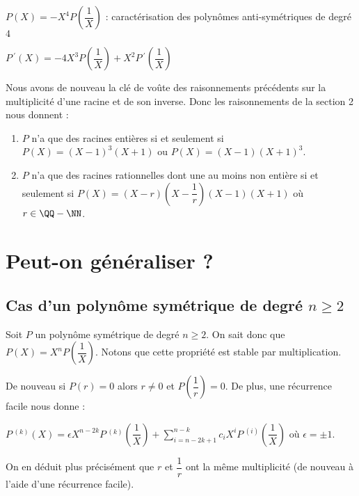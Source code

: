 \documentclass[12pt]{amsart}
\begin{document}
\medskip

$P(X) = -X^4 P\left( \dfrac1X \right)$ : caractérisation des polynômes anti-symétriques de degré $4$

\medskip

$P\,^{\prime}(X) = - 4 X^3 P\left( \dfrac1X \right) 
            + X^2 P\,^{\prime}\left( \dfrac1X \right)$


\medskip

Nous avons de nouveau la clé de voûte des raisonnements précédents sur la multiplicité d'une racine et de son inverse.
Donc les raisonnements de la section 2 nous donnent :

\begin{enumerate}
	\item $P$ n'a que des racines entières si et seulement si $P(X) = (X - 1)^3 (X + 1)$ ou $P(X) = (X - 1) (X + 1)^3$.

	\item $P$ n'a que des racines rationnelles dont une au moins non entière si et seulement si $P(X) = (X - r) \left( X - \dfrac1r \right) (X - 1) (X + 1)$ où $r \in \QQ - \NN$.
\end{enumerate}



\section{Peut-on généraliser ?}

\subsection*{Cas d'un polynôme symétrique de degré $n \geqslant 2$}

Soit $P$ un polynôme symétrique de degré $n \geqslant 2$. On sait donc que $P(X) = X^n P\left( \dfrac1X \right)$. Notons que cette propriété est stable par multiplication. 

\medskip

De nouveau si $P(r) = 0$ alors $r \neq 0$ et $P\left( \dfrac1r \right) = 0$.
De plus, une récurrence facile nous donne :

\medskip

$\displaystyle
  P\,^{(k)}(X) 
=
  \epsilon X^{n - 2k} P\,^{(k)}\left( \dfrac1X \right)
+
  \sum_{i = n - 2k + 1}^{n - k} c_i X^i P\,^{(i)}\left( \dfrac1X \right)$
où $\epsilon = \pm 1$.


\medskip

On en déduit plus précisément que $r$ et $\dfrac1r$ ont la même multiplicité (de nouveau à l'aide d'une récurrence facile).
\end{document}
